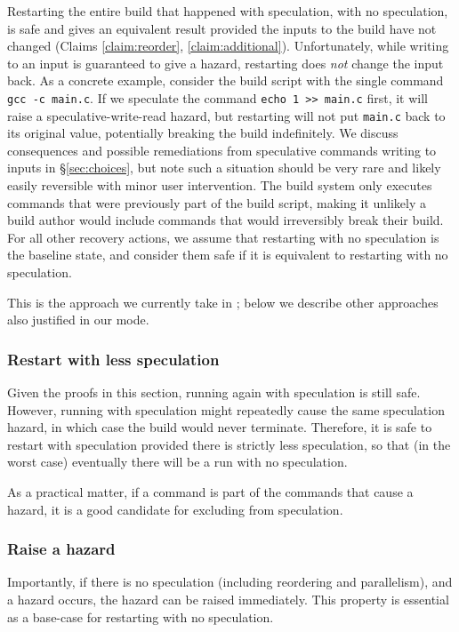 Restarting the entire build that happened with speculation, with no speculation, is safe and gives an equivalent result provided the inputs to the build have not changed (Claims \ref{claim:reorder}, \ref{claim:additional}). Unfortunately, while writing to an input is guaranteed to give a hazard, restarting does \emph{not} change the input back. As a concrete example, consider the build script with the single command \texttt{gcc -c main.c}. If we speculate the command \texttt{echo 1 >> main.c} first, it will raise a speculative-write-read hazard, but restarting will not put \texttt{main.c} back to its original value, potentially breaking the build indefinitely. We discuss consequences and possible remediations from speculative commands writing to inputs in \S\ref{sec:choices}, but note such a situation should be very rare and likely easily reversible with minor user intervention.  The build system only executes commands that were previously part of the build script, making it unlikely a build author would include commands that would irreversibly break their build.  For all other recovery actions, we assume that restarting with no speculation is the baseline state, and consider them safe if it is equivalent to restarting with no speculation.

This is the approach we currently take in \Rattle; below we describe
other approaches also justified in our mode.

\subsubsection{Restart with less speculation}
\label{sec:recovering}

Given the proofs in this section, running again with speculation is still safe. However, running with speculation might repeatedly cause the same speculation hazard, in which case the build would never terminate. Therefore, it is safe to restart with speculation provided there is strictly less speculation, so that (in the worst case) eventually there will be a run with no speculation.

As a practical matter, if a command is part of the commands that cause a hazard, it is a good candidate for excluding from speculation.

\subsubsection{Raise a hazard}

Importantly, if there is no speculation (including reordering and parallelism), and a hazard occurs, the hazard can be raised immediately. This property is essential as a base-case for restarting with no speculation.

